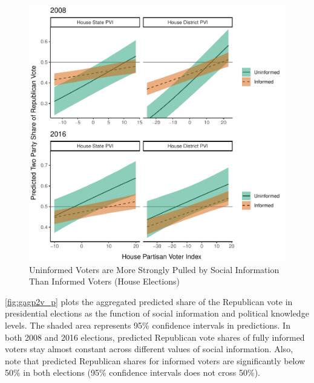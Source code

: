 \documentclass[doc,natbib,12pt]{apa6}\usepackage[]{graphicx}\usepackage[]{color}
\makeatletter
\def\maxwidth{ %
  \ifdim\Gin@nat@width>\linewidth
    \linewidth
  \else
    \Gin@nat@width
  \fi
}
\newenvironment{knitrout}{}{} %
\makeatother
\begin{document}
\begin{knitrout}
\color{fgcolor}\begin{figure}[t!!!]

{\centering \includegraphics[width=\maxwidth]{figure/gagp2v_h-1} 

}

\caption[Uninformed Voters are More Strongly Pulled by Social Information Than Informed Voters (House Elections)]{Uninformed Voters are More Strongly Pulled by Social Information Than Informed Voters (House Elections)}\label{fig:gagp2v_h}
\end{figure}


\end{knitrout}
    
    \par \autoref{fig:gagp2v_p} plots the aggregated predicted share of the Republican vote in presidential elections as the function of social information and political knowledge levels. The shaded area represents 95\% confidence intervals in predictions. In both 2008 and 2016 elections, predicted Republican vote shares of fully informed voters stay almost constant across different values of social information. Also, note that predicted Republican shares for informed voters are significantly below 50\% in both elections (95\% confidence intervals does not cross 50\%). 
    
\end{document}
